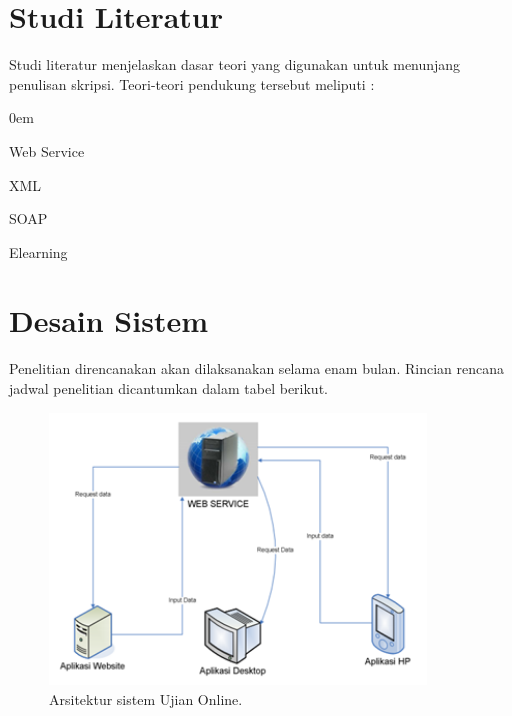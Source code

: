 \documentclass{jtetiproposalskripsi}
\begin{document}
\section{Studi Literatur}
Studi literatur menjelaskan dasar teori yang digunakan untuk menunjang penulisan skripsi.
Teori-teori pendukung tersebut meliputi :
\vspace{-0.5cm}
\begin{enumerate}[a.]
\begin{singlespace}
\itemsep0em
\item Web Service
\item XML
\item SOAP
\item Elearning
\end{singlespace}
\end{enumerate}

\section{Desain Sistem}
Penelitian direncanakan akan dilaksanakan selama enam bulan. Rincian rencana jadwal penelitian dicantumkan dalam tabel berikut.


\vspace{-0.5cm}
\begin{figure}[ht!]
  \centering
    \includegraphics[width=10cm]{gambar/arsiteksistem}
    \caption{Arsitektur sistem Ujian Online.}
    \label{openwrt}
\end{figure}
\end{document}
